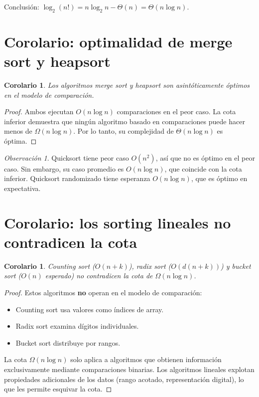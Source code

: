 \documentclass[11pt, letterpaper]{article}
\theoremstyle{definition}
\theoremstyle{plain}
\newtheorem{corollary}[theorem]{Corolario}
\theoremstyle{remark}
\newtheorem{remark}{Observación}[section]
\begin{document}
Conclusión:
$\log_2(n!) = n\log_2 n - \Theta(n) = \Theta(n \log n)$.

\section{Corolario: optimalidad de merge sort y heapsort}

\begin{corollary}\label{cor:optimal}
Los algoritmos merge sort y heapsort son asintóticamente óptimos en el
modelo de comparación.
\end{corollary}

\begin{proof}
Ambos ejecutan $O(n \log n)$ comparaciones en el peor caso. La cota
inferior demuestra que ningún algoritmo basado en comparaciones puede
hacer menos de $\Omega(n \log n)$. Por lo tanto, su complejidad de
$\Theta(n \log n)$ es óptima.
\end{proof}

\begin{remark}
Quicksort tiene peor caso $O(n^2)$, así que no es óptimo en el peor
caso. Sin embargo, su caso promedio es $O(n \log n)$, que coincide con
la cota inferior. Quicksort randomizado tiene esperanza $O(n \log n)$,
que es óptimo en expectativa.
\end{remark}

\section{Corolario: los sorting lineales no contradicen la cota}

\begin{corollary}\label{cor:linear}
Counting sort ($O(n + k)$), radix sort ($O(d(n + k))$) y bucket sort
($O(n)$ esperado) no contradicen la cota de $\Omega(n \log n)$.
\end{corollary}

\begin{proof}
Estos algoritmos \textbf{no} operan en el modelo de comparación:
\begin{itemize}
  \item Counting sort usa valores como índices de array.
  \item Radix sort examina dígitos individuales.
  \item Bucket sort distribuye por rangos.
\end{itemize}
La cota $\Omega(n \log n)$ solo aplica a algoritmos que obtienen
información exclusivamente mediante comparaciones binarias. Los
algoritmos lineales explotan propiedades adicionales de los datos
(rango acotado, representación digital), lo que les permite esquivar
la cota.
\end{proof}
\end{document}
